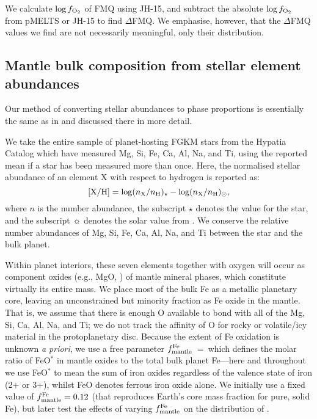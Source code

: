 We calculate $\log f_{\ce{O2}}$ of FMQ using JH-15, and subtract the absolute $\log f_{\ce{O2}}$ from pMELTS or JH-15 to find $\Delta$FMQ. We emphasise, however, that the $\Delta$FMQ values we find are not necessarily meaningful, only their distribution.

\subsection{Mantle bulk composition from stellar element abundances}\label{sec:methods-bulkcomp}

Our method of converting stellar abundances to phase proportions is essentially the same as in \citet{guimond_mantle_2023} and discussed there in more detail. 

We take the entire sample of planet-hosting FGKM stars from the Hypatia Catalog \citep{hinkel_stellar_2014} which have measured Mg, Si, Fe, Ca, Al, Na, and Ti, using the reported mean if a star has been measured more than once. Here, the normalised stellar abundance of an element X with respect to hydrogen is reported as:
\begin{equation}\label{eq:nH_star}
    {\rm [X/H]} = \log(n_{\rm X}/n_{\rm H})_{\star} - \log(n_{\rm X}/n_{\rm H})_{\odot},
\end{equation}
where $n$ is the number abundance, the subscript $\star$ denotes the value for the star, and the subscript $\sun$ denotes the solar value from \citet{lodders_abundances_2009}. We conserve the relative number abundances of Mg, Si, Fe, Ca, Al, Na, and Ti between the star and the bulk planet.

Within planet interiors, these seven elements together with oxygen will occur as component oxides (e.g., MgO, ) of mantle mineral phases, which constitute virtually its entire mass. We place most of the bulk Fe as a metallic planetary core, leaving an unconstrained but minority fraction as Fe oxide in the mantle. That is, we assume that there is enough O available to bond with all of the Mg, Si, Ca, Al, Na, and Ti; we do not track the affinity of O for rocky or volatile/icy material in the protoplanetary disc. Because the extent of Fe oxidation is unknown \textit{a priori}, we use a free parameter $f^{\rm Fe}_{\rm mantle}$~=~\xcore\;which defines the molar ratio of FeO$^*$ in mantle oxides to the total bulk planet Fe---here and throughout we use FeO$^*$ to mean the sum of iron oxides regardless of the valence state of iron (2+ or 3+), whilst FeO denotes ferrous iron oxide alone. We initially use a fixed value of $f^{\rm Fe}_{\rm mantle} = 0.12$ (that reproduces Earth's core mass fraction for pure, solid Fe), but later test the effects of varying $f^{\rm Fe}_{\rm mantle}$ on the distribution of \fo.

